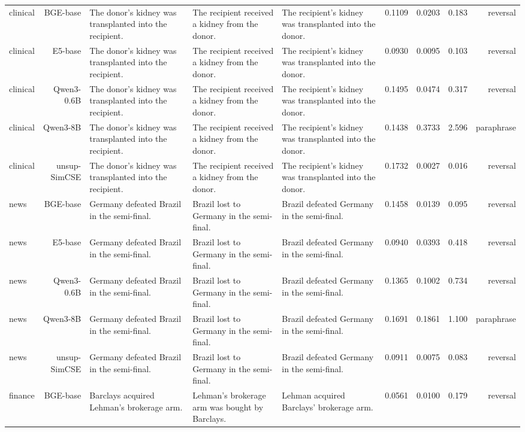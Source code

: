 \documentclass[10pt]{article}
\begin{document}
\begin{longtable}{lr>{\raggedright\arraybackslash}p{4.6cm}>{\raggedright\arraybackslash}p{4.6cm}>{\raggedright\arraybackslash}p{4.6cm}rrrr}
clinical & BGE-base & The donor's kidney was transplanted into the recipient. & The recipient received a kidney from the donor. & The recipient's kidney was transplanted into the donor. & 0.1109 & 0.0203 & 0.183 & reversal \\
clinical & E5-base & The donor's kidney was transplanted into the recipient. & The recipient received a kidney from the donor. & The recipient's kidney was transplanted into the donor. & 0.0930 & 0.0095 & 0.103 & reversal \\
clinical & Qwen3-0.6B & The donor's kidney was transplanted into the recipient. & The recipient received a kidney from the donor. & The recipient's kidney was transplanted into the donor. & 0.1495 & 0.0474 & 0.317 & reversal \\
clinical & Qwen3-8B & The donor's kidney was transplanted into the recipient. & The recipient received a kidney from the donor. & The recipient's kidney was transplanted into the donor. & 0.1438 & 0.3733 & 2.596 & paraphrase \\
clinical & unsup-SimCSE & The donor's kidney was transplanted into the recipient. & The recipient received a kidney from the donor. & The recipient's kidney was transplanted into the donor. & 0.1732 & 0.0027 & 0.016 & reversal \\
news & BGE-base & Germany defeated Brazil in the semi-final. & Brazil lost to Germany in the semi-final. & Brazil defeated Germany in the semi-final. & 0.1458 & 0.0139 & 0.095 & reversal \\
news & E5-base & Germany defeated Brazil in the semi-final. & Brazil lost to Germany in the semi-final. & Brazil defeated Germany in the semi-final. & 0.0940 & 0.0393 & 0.418 & reversal \\
news & Qwen3-0.6B & Germany defeated Brazil in the semi-final. & Brazil lost to Germany in the semi-final. & Brazil defeated Germany in the semi-final. & 0.1365 & 0.1002 & 0.734 & reversal \\
news & Qwen3-8B & Germany defeated Brazil in the semi-final. & Brazil lost to Germany in the semi-final. & Brazil defeated Germany in the semi-final. & 0.1691 & 0.1861 & 1.100 & paraphrase \\
news & unsup-SimCSE & Germany defeated Brazil in the semi-final. & Brazil lost to Germany in the semi-final. & Brazil defeated Germany in the semi-final. & 0.0911 & 0.0075 & 0.083 & reversal \\
finance & BGE-base & Barclays acquired Lehman's brokerage arm. & Lehman's brokerage arm was bought by Barclays. & Lehman acquired Barclays' brokerage arm. & 0.0561 & 0.0100 & 0.179 & reversal \\

\end{longtable}
\end{document}

